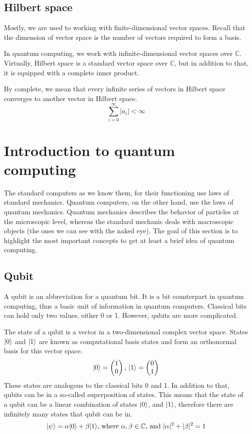 \subsection{Hilbert space}
Mostly, we are used to working with finite-dimensional vector spaces. Recall that the dimension of vector space is the number of vectors required to form a basis.

In quantum computing, we work with infinite-dimensional vector spaces over $\mathbb{C}$. Virtually, Hilbert space is a standard vector space over $\mathbb{C}$, but in addition to that, it is equipped with a complete inner product.

By complete, we mean that every infinite series of vectors in Hilbert space converges to another vector in Hilbert space. $$\sum_{i=0}^{\infty}\vert a_i \vert < \infty$$


\section{Introduction to quantum computing}
The standard computers as we know them, for their functioning use laws of standard mechanics. Quantum computers, on the other hand, use the laws of quantum mechanics. Quantum mechanics describes the behavior of particles at the microscopic level, whereas the standard mechanic deals with macroscopic objects (the ones we can see with the naked eye). The goal of this section is to highlight the most important concepts to get at least a brief idea of quantum computing.

\subsection{Qubit}
A qubit is an abbreviation for a quantum bit. It is a bit counterpart in quantum computing, thus a basic unit of information in quantum computers. Classical bits can hold only two values, either 0 or 1. However, qubits are more complicated.

The state of a qubit is a vector in a two-dimensional complex vector space. States $\lvert0\rangle$ and $\lvert1\rangle$ are known as computational basis states and form an orthonormal basis for this vector space. \cite{qc} 
$$\lvert0\rangle = \begin{pmatrix} 1 \\ 0 \end{pmatrix}\text{, }\lvert1\rangle = \begin{pmatrix} 0 \\ 1 \end{pmatrix}$$
These states are analogous to the classical bits 0 and 1. In addition to that, qubits can be in a so-called superposition of states. This means that the state of a qubit can be a linear combination of states $\lvert0\rangle$, and $\lvert1\rangle$, therefore there are infinitely many states that qubit can be in. $$\lvert\psi\rangle = \alpha \lvert0\rangle + 
\beta \lvert1\rangle\text{, where } \alpha,\beta \in \mathbb{C}\text{, and } \lvert \alpha \rvert^2 + \lvert \beta \rvert^2 = 1$$

